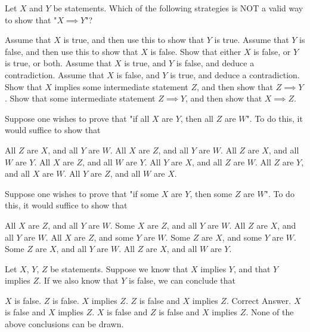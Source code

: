 \documentclass[twoside,a4paper,leqno]{article}
\begin{document}
\begin{esercizi*}{}
\begin{exerm}
  Let $X$ and $Y$ be statements.  Which of the following strategies is NOT a valid way to show that "$X \implies Y$"?
\begin{rispm}
\risp  Assume that $X$ is true, and then use this to show that $Y$ is true.
\risp  Assume that $Y$ is false, and then use this to show that $X$ is false.
\risp  Show that either $X$ is false, or $Y$ is true, or both.
\risp  Assume that $X$ is true, and $Y$ is false, and deduce a contradiction.
\risp[=]  Assume that $X$ is false, and $Y$ is true, and deduce a contradiction.
\risp  Show that $X$ implies some intermediate statement $Z$, and then show that $Z \implies Y$.
\risp  Show that some intermediate statement $Z \implies Y$, and then show that $X \implies Z$.
\end{rispm}
\end{exerm}

\begin{exerm}
  Suppose one wishes to prove that "if all $X$ are $Y$, then all $Z$ are $W$".  To do this, it would suffice to show that
\begin{rispm}
\risp[=]  All $Z$ are $X$, and all $Y$ are $W$.
\risp  All $X$ are $Z$, and all $Y$ are $W$.
\risp  All $Z$ are $X$, and all $W$ are $Y$.
\risp  All $X$ are $Z$, and all $W$ are $Y$.
\risp  All $Y$ are $X$, and all $Z$ are $W$.
\risp  All $Z$ are $Y$, and all $X$ are $W$.
\risp  All $Y$ are $Z$, and all $W$ are $X$.
\end{rispm}
\end{exerm}

\begin{exerm}
  Suppose one wishes to prove that "if some $X$ are $Y$, then some $Z$ are $W$".  To do this, it would suffice to show that
\begin{rispm}
\risp[=]  All $X$ are $Z$, and all $Y$ are $W$.
\risp  Some $X$ are $Z$, and all $Y$ are $W$.
\risp  All $Z$ are $X$, and all $Y$ are $W$.
\risp  All $X$ are $Z$, and some $Y$ are $W$.
\risp  Some $Z$ are $X$, and some $Y$ are $W$.
\risp  Some $Z$ are $X$, and all $Y$ are $W$.
\risp  All $Z$ are $X$, and all $W$ are $Y$.
\end{rispm}
\end{exerm}

\begin{exerm}
  Let $X$, $Y$, $Z$ be statements.  Suppose we know that $X$ implies $Y$, and that $Y$ implies $Z$.  If we also know that $Y$ is false, we can conclude that
\begin{rispm}
\risp  $X$ is false.
\risp  $Z$ is false.
\risp  $X$ implies $Z$.
\risp  $Z$ is false and $X$ implies $Z$.  Correct Answer.  $X$ is false and $X$ implies $Z$.
\risp  $X$ is false and $Z$ is false and $X$ implies $Z$.  
\risp  None of the above conclusions can be drawn.
\end{rispm}
\end{exerm}




\end{esercizi*}
\end{document}

